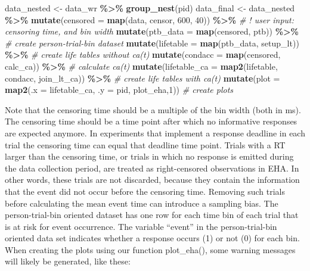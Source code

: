 \documentclass[
  man,floatsintext]{apa6}
\newenvironment{Shaded}{\begin{snugshade}}{\end{snugshade}}
\newcommand{\AttributeTok}[1]{\textcolor[rgb]{0.13,0.29,0.53}{#1}}
\newcommand{\CommentTok}[1]{\textcolor[rgb]{0.56,0.35,0.01}{\textit{#1}}}
\newcommand{\DecValTok}[1]{\textcolor[rgb]{0.00,0.00,0.81}{#1}}
\newcommand{\FunctionTok}[1]{\textcolor[rgb]{0.13,0.29,0.53}{\textbf{#1}}}
\newcommand{\NormalTok}[1]{#1}
\newcommand{\OtherTok}[1]{\textcolor[rgb]{0.56,0.35,0.01}{#1}}
\newcommand{\SpecialCharTok}[1]{\textcolor[rgb]{0.81,0.36,0.00}{\textbf{#1}}}
\begin{document}
\begin{Shaded}
\begin{Highlighting}[]
\NormalTok{data\_nested }\OtherTok{\textless{}{-}}\NormalTok{ data\_wr }\SpecialCharTok{\%\textgreater{}\%} \FunctionTok{group\_nest}\NormalTok{(pid)}
\NormalTok{data\_final }\OtherTok{\textless{}{-}}\NormalTok{ data\_nested }\SpecialCharTok{\%\textgreater{}\%} 
  \FunctionTok{mutate}\NormalTok{(}\AttributeTok{censored  =} \FunctionTok{map}\NormalTok{(data, censor, }\DecValTok{600}\NormalTok{, }\DecValTok{40}\NormalTok{)) }\SpecialCharTok{\%\textgreater{}\%}   \CommentTok{\# ! user input: censoring time, and bin width}
  \FunctionTok{mutate}\NormalTok{(}\AttributeTok{ptb\_data  =} \FunctionTok{map}\NormalTok{(censored, ptb)) }\SpecialCharTok{\%\textgreater{}\%}           \CommentTok{\# create person{-}trial{-}bin dataset}
  \FunctionTok{mutate}\NormalTok{(}\AttributeTok{lifetable =} \FunctionTok{map}\NormalTok{(ptb\_data, setup\_lt)) }\SpecialCharTok{\%\textgreater{}\%}      \CommentTok{\# create life tables without ca(t)}
  \FunctionTok{mutate}\NormalTok{(}\AttributeTok{condacc   =} \FunctionTok{map}\NormalTok{(censored, calc\_ca)) }\SpecialCharTok{\%\textgreater{}\%}       \CommentTok{\# calculate ca(t)}
  \FunctionTok{mutate}\NormalTok{(}\AttributeTok{lifetable\_ca =} \FunctionTok{map2}\NormalTok{(lifetable, condacc, join\_lt\_ca)) }\SpecialCharTok{\%\textgreater{}\%}    \CommentTok{\# create life tables with ca(t)}
  \FunctionTok{mutate}\NormalTok{(}\AttributeTok{plot      =} \FunctionTok{map2}\NormalTok{(}\AttributeTok{.x =}\NormalTok{ lifetable\_ca, }\AttributeTok{.y =}\NormalTok{ pid, plot\_eha,}\DecValTok{1}\NormalTok{))  }\CommentTok{\# create plots }
\end{Highlighting}
\end{Shaded}

\normalsize

Note that the censoring time should be a multiple of the bin width (both in ms). The censoring time should be a time point after which no informative responses are expected anymore. In experiments that implement a response deadline in each trial the censoring time can equal that deadline time point. Trials with a RT larger than the censoring time, or trials in which no response is emitted during the data collection period, are treated as right-censored observations in EHA. In other words, these trials are not discarded, because they contain the information that the event did not occur before the censoring time. Removing such trials before calculating the mean event time can introduce a sampling bias. The person-trial-bin oriented dataset has one row for each time bin of each trial that is at risk for event occurrence. The variable ``event'' in the person-trial-bin oriented data set indicates whether a response occurs (1) or not (0) for each bin.
When creating the plots using our function plot\_eha(), some warning messages will likely be generated, like these:
\end{document}
